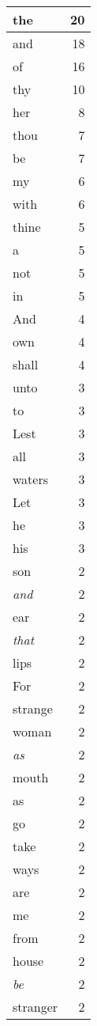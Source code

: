 \begin{center}
\begin{longtable}{l|r}
the & 20\\ \hline 
and & 18\\ \hline 
of & 16\\ \hline 
thy & 10\\ \hline 
her & 8\\ \hline 
thou & 7\\ \hline 
be & 7\\ \hline 
my & 6\\ \hline 
with & 6\\ \hline 
thine & 5\\ \hline 
a & 5\\ \hline 
not & 5\\ \hline 
in & 5\\ \hline 
And & 4\\ \hline 
own & 4\\ \hline 
shall & 4\\ \hline 
unto & 3\\ \hline 
to & 3\\ \hline 
Lest & 3\\ \hline 
all & 3\\ \hline 
waters & 3\\ \hline 
Let & 3\\ \hline 
he & 3\\ \hline 
his & 3\\ \hline 
son & 2\\ \hline 
\emph{and} & 2\\ \hline 
ear & 2\\ \hline 
\emph{that} & 2\\ \hline 
lips & 2\\ \hline 
For & 2\\ \hline 
strange & 2\\ \hline 
woman & 2\\ \hline 
\emph{as} & 2\\ \hline 
mouth & 2\\ \hline 
as & 2\\ \hline 
go & 2\\ \hline 
take & 2\\ \hline 
ways & 2\\ \hline 
are & 2\\ \hline 
me & 2\\ \hline 
from & 2\\ \hline 
house & 2\\ \hline 
\emph{be} & 2\\ \hline 
stranger & 2\\ \hline 

\end{longtable}
\end{center}
